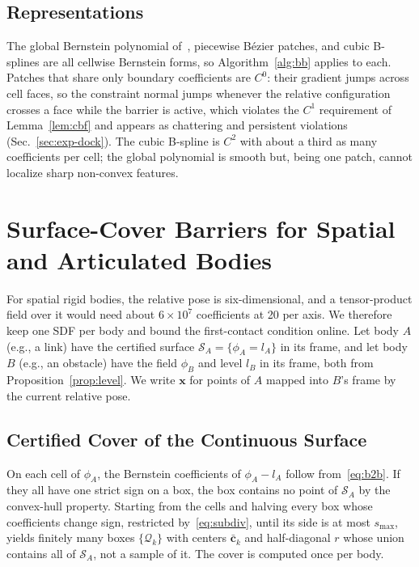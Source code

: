 \documentclass[journal]{IEEEtran}
\theoremstyle{definition}
\begin{document}
\subsection{Representations}\label{sec:repr}
The global Bernstein polynomial of~\cite{jo2026geometry}, piecewise B\'ezier patches, and cubic
B-splines are all cellwise Bernstein forms, so Algorithm~\ref{alg:bb} applies to each. Patches that
share only boundary coefficients are $C^0$: their gradient jumps across cell faces, so the
constraint normal jumps whenever the relative configuration crosses a face while the barrier is
active, which violates the $C^1$ requirement of Lemma~\ref{lem:cbf} and appears as chattering and
persistent violations (Sec.~\ref{sec:exp-dock}). The cubic B-spline is $C^2$ with about a third as
many coefficients per cell; the global polynomial is smooth but, being one patch, cannot localize
sharp non-convex features.

\section{Surface-Cover Barriers for Spatial and Articulated Bodies}\label{sec:cover}
For spatial rigid bodies, the relative pose is six-dimensional, and a tensor-product field over it
would need about $6\times10^7$ coefficients at 20 per axis. We therefore keep one SDF per body and
bound the first-contact condition online. Let body $A$ (e.g., a link) have the certified surface
$\mathcal S_A=\{\phi_A=l_A\}$ in its frame, and let body $B$ (e.g., an obstacle) have the field
$\phi_B$ and level $l_B$ in its frame, both from Proposition~\ref{prop:level}. We write $\mathbf x$
for points of $A$ mapped into $B$'s frame by the current relative pose.

\subsection{Certified Cover of the Continuous Surface}
On each cell of $\phi_A$, the Bernstein coefficients of $\phi_A-l_A$ follow from~\eqref{eq:b2b}. If
they all have one strict sign on a box, the box contains no point of $\mathcal S_A$ by the
convex-hull property. Starting from the cells and halving every box whose coefficients change sign,
restricted by~\eqref{eq:subdiv}, until its side is at most $s_{\max}$, yields finitely many boxes
$\{\mathcal Q_k\}$ with centers $\bar{\mathbf c}_k$ and half-diagonal $r$ whose union contains all of
$\mathcal S_A$, not a sample of it. The cover is computed once per body.
\end{document}
